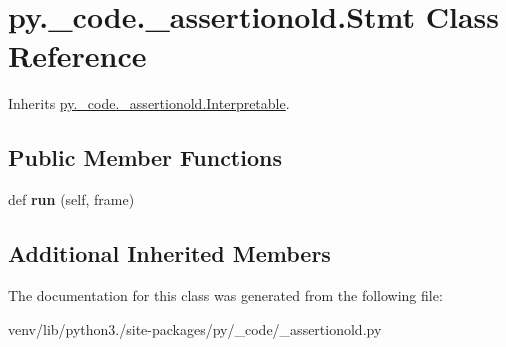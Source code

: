 \hypertarget{classpy_1_1__code_1_1__assertionold_1_1_stmt}{}\section{py.\+\_\+code.\+\_\+assertionold.\+Stmt Class Reference}
\label{classpy_1_1__code_1_1__assertionold_1_1_stmt}


Inherits \hyperlink{classpy_1_1__code_1_1__assertionold_1_1_interpretable}{py.\+\_\+code.\+\_\+assertionold.\+Interpretable}.

\subsection*{Public Member Functions}
\begin{DoxyCompactItemize}
\item 
\mbox{\label{classpy_1_1__code_1_1__assertionold_1_1_stmt_a91168d9fa0a350bd5df3c96428a2cb4b}} 
def {\bfseries run} (self, frame)
\end{DoxyCompactItemize}
\subsection*{Additional Inherited Members}


The documentation for this class was generated from the following file\+:\begin{DoxyCompactItemize}
\item 
venv/lib/python3./site-\/packages/py/\+\_\+code/\+\_\+assertionold.\+py\end{DoxyCompactItemize}
